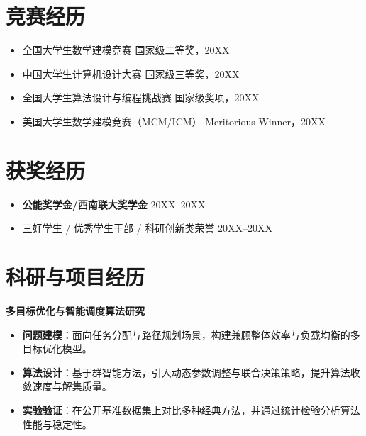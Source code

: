 \documentclass[12pt]{article}
\newlength{\iconwidth}
\begin{document}
\vspace{-0.7em}

\section[竞赛经历]{\makebox[\iconwidth][c]{\color{primary_color}{\faAtom}}\quad 竞赛经历}
\begin{itemize}
    \item 全国大学生数学建模竞赛 \hfill 国家级二等奖，20XX
    \item 中国大学生计算机设计大赛 \hfill 国家级三等奖，20XX
    \item 全国大学生算法设计与编程挑战赛 \hfill 国家级奖项，20XX
    \item 美国大学生数学建模竞赛（MCM/ICM） \hfill Meritorious Winner，20XX
\end{itemize}

\vspace{-0.7em}

\section[获奖经历]{\makebox[\iconwidth][c]{\color{primary_color}{\faTrophy}}\quad 获奖经历}
\begin{itemize}
    \item \textbf{公能奖学金/西南联大奖学金} \hfill 20XX--20XX
    \item 三好学生 / 优秀学生干部 / 科研创新类荣誉 \hfill 20XX--20XX
\end{itemize}

\vspace{-0.7em}

\section[科研与项目经历]{\makebox[\iconwidth][c]{\color{primary_color}{\faFlask}}\quad 科研与项目经历}


{\large \textbf{多目标优化与智能调度算法研究}}

\begin{itemize}
    \item \textbf{问题建模}：面向任务分配与路径规划场景，构建兼顾整体效率与负载均衡的多目标优化模型。
    \item \textbf{算法设计}：基于群智能方法，引入动态参数调整与联合决策策略，提升算法收敛速度与解集质量。
    \item \textbf{实验验证}：在公开基准数据集上对比多种经典方法，并通过统计检验分析算法性能与稳定性。
\end{itemize}
\end{document}
